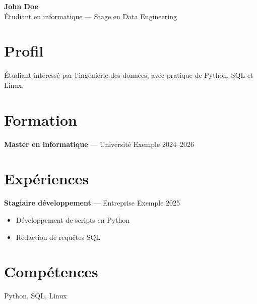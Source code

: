\documentclass[11pt,a4paper]{article}
\begin{document}
\begin{center}
{\LARGE\bfseries John Doe }\\[3pt]
Étudiant en informatique — Stage en Data Engineering
\end{center}

\section*{Profil}
Étudiant intéressé par l’ingénierie des données, avec pratique de Python, SQL et Linux.

\section*{Formation}

\textbf{Master en informatique} --- Université Exemple \hfill 2024–2026\par


\section*{Expériences}

\textbf{Stagiaire développement} --- Entreprise Exemple \hfill 2025\par
\begin{itemize}

\item Développement de scripts en Python

\item Rédaction de requêtes SQL

\end{itemize}


\section*{Compétences}
Python, SQL, Linux
\end{document}
